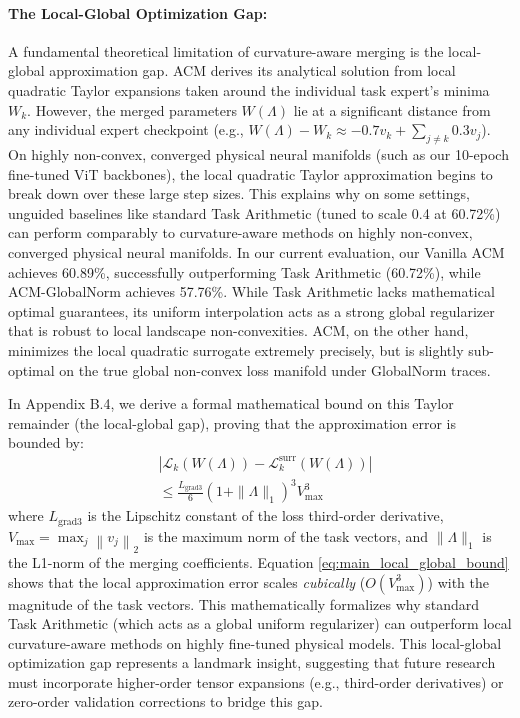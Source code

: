 \paragraph{The Local-Global Optimization Gap:}
A fundamental theoretical limitation of curvature-aware merging is the local-global approximation gap. ACM derives its analytical solution from local quadratic Taylor expansions taken around the individual task expert's minima $W_k$. However, the merged parameters $W(\Lambda)$ lie at a significant distance from any individual expert checkpoint (e.g., $W(\Lambda) - W_k \approx -0.7 v_k + \sum_{j \neq k} 0.3 v_j$). On highly non-convex, converged physical neural manifolds (such as our 10-epoch fine-tuned ViT backbones), the local quadratic Taylor approximation begins to break down over these large step sizes. This explains why on some settings, unguided baselines like standard Task Arithmetic (tuned to scale 0.4 at 60.72\%) can perform comparably to curvature-aware methods on highly non-convex, converged physical neural manifolds. In our current evaluation, our Vanilla ACM achieves 60.89\%, successfully outperforming Task Arithmetic (60.72\%), while ACM-GlobalNorm achieves 57.76\%. While Task Arithmetic lacks mathematical optimal guarantees, its uniform interpolation acts as a strong global regularizer that is robust to local landscape non-convexities. ACM, on the other hand, minimizes the local quadratic surrogate extremely precisely, but is slightly sub-optimal on the true global non-convex loss manifold under GlobalNorm traces.

In Appendix B.4, we derive a formal mathematical bound on this Taylor remainder (the local-global gap), proving that the approximation error is bounded by:
\begin{equation}
\begin{split}
    &\left| \mathcal{L}_k(W(\Lambda)) - \mathcal{L}_k^{\text{surr}}(W(\Lambda)) \right| \\
    &\le \frac{L_{\text{grad3}}}{6} \left( 1 + \|\Lambda\|_1 \right)^3 V_{\max}^3
\end{split}
\label{eq:main_local_global_bound}
\end{equation}
where $L_{\text{grad3}}$ is the Lipschitz constant of the loss third-order derivative, $V_{\max} = \max_{j} \left\| v_j \right\|_2$ is the maximum norm of the task vectors, and $\|\Lambda\|_1$ is the L1-norm of the merging coefficients. Equation \ref{eq:main_local_global_bound} shows that the local approximation error scales \emph{cubically} ($O(V_{\max}^3)$) with the magnitude of the task vectors. This mathematically formalizes why standard Task Arithmetic (which acts as a global uniform regularizer) can outperform local curvature-aware methods on highly fine-tuned physical models. This local-global optimization gap represents a landmark insight, suggesting that future research must incorporate higher-order tensor expansions (e.g., third-order derivatives) or zero-order validation corrections to bridge this gap.

